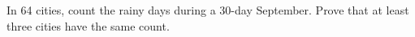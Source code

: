In 64 cities, count the rainy days during a 30-day September. Prove that at least three cities have the same count.
